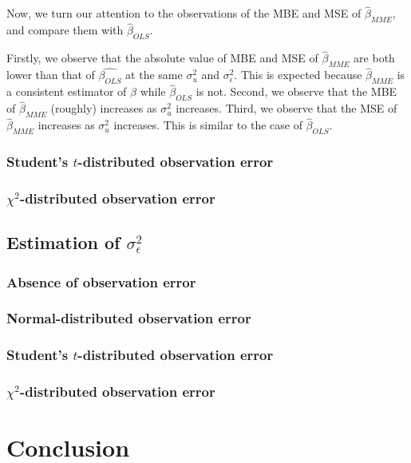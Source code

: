 \documentclass{article}
\begin{document}
Now, we turn our attention to the observations of the MBE and MSE of $\hat{\beta}_{MME}$, and compare them with $\hat{\beta}_{OLS}$.

Firstly, we observe that the absolute value of MBE and MSE of $\hat{\beta}_{MME}$ are both lower than that of $\hat{\beta_{OLS}}$ at the same $\sigma^2_u$ and $\sigma^2_\epsilon$.
This is expected because $\hat{\beta}_{MME}$ is a consistent estimator of $\beta$ while $\hat{\beta}_{OLS}$ is not.
Second, we observe that the MBE of $\hat{\beta}_{MME}$ (roughly) increases as $\sigma^2_u$ increases.
Third, we observe that the MSE of $\hat{\beta}_{MME}$ increases as $\sigma^2_u$ increases. This is similar to the case of $\hat{\beta}_{OLS}$.

\subsubsection{Student's $t$-distributed observation error}

\subsubsection{$\chi^2$-distributed observation error}

\subsection{Estimation of $\sigma^2_\epsilon$}

\subsubsection{Absence of observation error}

\subsubsection{Normal-distributed observation error}

\subsubsection{Student's $t$-distributed observation error}

\subsubsection{$\chi^2$-distributed observation error}

\section{Conclusion}
\end{document}
